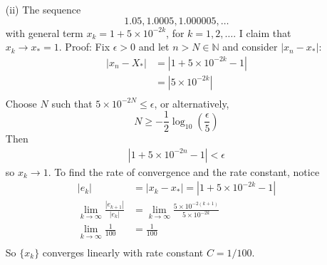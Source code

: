 \documentclass{article}
\begin{document}
\begin{itemize}
    \item[(ii)] The sequence 
    \[1.05, 1.0005, 1.000005, \dots\]
    with general term $x_k = 1 + 5 \times 10^{-2k}$, for $k = 1, 2, \dots$.
    \newline\newline
    I claim that $x_k \to x_* = 1$. 
    \newline
    Proof: Fix $\epsilon > 0$ and let $n > N \in \mathbb{N}$ and consider $|x_n - x_*|$:
    \begin{align*}
        |x_n - X_*| &= |1 + 5\times 10^{-2k} -1| \\
        &= |5\times 10^{-2k}| \\
    \end{align*}
    Choose $N$ such that $5\times 10^{-2N} \leq \epsilon$, or alternatively,
    \[N \geq -\frac{1}{2}\log_{10}\left(\frac{\epsilon}{5}\right)\]
    Then
    \begin{align*}
        |1 + 5 \times 10^{-2n} - 1| < \epsilon
    \end{align*}
    so $x_k \to 1$. 
    \newline\newline
    To find the rate of convergence and the rate constant, notice
    \begin{align*}
        |e_k| &= |x_k - x_*| = |1 + 5\times 10^{-2k} - 1| \\
        \lim_{k\to \infty} \frac{|e_{k+1}|}{|e_k|} &= \lim_{k \to \infty} \frac{5\times 10^{-2(k+1)}}{5\times 10^{-2k}} \\
        \lim_{k \to \infty} \frac{1}{100} &= \frac{1}{100} \\
    \end{align*}
    So $\{x_k\}$ converges linearly with rate constant $C = 1/100$.


\end{itemize}
\end{document}
